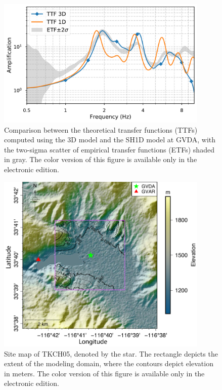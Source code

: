 \clearpage
\begin{figure}[!ht]
  \centering
  \includegraphics[width=0.9\textwidth]{figures/figure_etf_4.pdf}
  \caption{Comparison between the theoretical transfer functions (TTFs) computed using the 3D model and the SH1D model at GVDA, with the two-sigma scatter of empirical transfer functions (ETFs) shaded in gray. The color version of this figure is available only in the electronic edition.}
  \label{fig:etf-4}
\end{figure}

\clearpage
\begin{figure}[!ht]
  \centering
  \includegraphics[width=0.9\textwidth]{figures/figure_etf_5.pdf}
  \caption{Site map of TKCH05, denoted by the star. The rectangle depicts the extent of the modeling domain, where the contours depict elevation in meters. The color version of this figure is available only in the electronic edition.}
  \label{fig:etf-5}
\end{figure}

